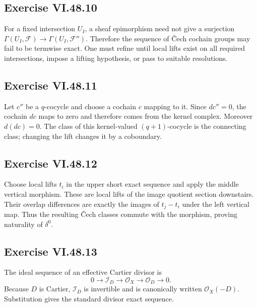\subsection*{Exercise VI.48.10}
\begin{solution}
For a fixed intersection \(U_I\), a sheaf epimorphism need not give a surjection
\(\Gamma(U_I,\mathcal F)\to\Gamma(U_I,\mathcal F'')\).  Therefore the sequence of Čech cochain groups may fail to be termwise exact.  One must refine until local lifts exist on all required intersections, impose a lifting hypothesis, or pass to suitable resolutions.
\end{solution}

\subsection*{Exercise VI.48.11}
\begin{solution}
Let \(c''\) be a \(q\)-cocycle and choose a cochain \(c\) mapping to it.  Since \(d c''=0\), the cochain \(dc\) maps to zero and therefore comes from the kernel complex.  Moreover \(d(dc)=0\).  The class of this kernel-valued \((q+1)\)-cocycle is the connecting class; changing the lift changes it by a coboundary.
\end{solution}

\subsection*{Exercise VI.48.12}
\begin{solution}
Choose local lifts \(t_i\) in the upper short exact sequence and apply the middle vertical morphism.  These are local lifts of the image quotient section downstairs.  Their overlap differences are exactly the images of \(t_j-t_i\) under the left vertical map.  Thus the resulting Čech classes commute with the morphism, proving naturality of \(\delta^0\).
\end{solution}

\subsection*{Exercise VI.48.13}
\begin{solution}
The ideal sequence of an effective Cartier divisor is
\[
0\to\mathcal I_D\to\mathcal O_X\to\mathcal O_D\to0.
\]
Because \(D\) is Cartier, \(\mathcal I_D\) is invertible and is canonically written \(\mathcal O_X(-D)\).  Substitution gives the standard divisor exact sequence.
\end{solution}

